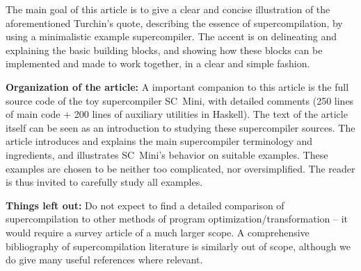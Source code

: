 The main goal of this article is to give a clear and concise illustration of the
aforementioned Turchin's quote, describing the essence of supercompilation,
by using a minimalistic example supercompiler.
The accent is on delineating and explaining the basic building blocks, 
and showing how these blocks can be implemented and made to work together,
in a clear and simple fashion.

\textbf{Organization of the article:}
A important companion to this article is the full source code of the toy supercompiler
SC~Mini, with detailed comments \cite{SCMiniUrl}
(250 lines of main code + 200 lines of auxiliary utilities in Haskell).
The text of the article itself can be seen as an introduction to studying
these supercompiler sources.
The article introduces and explains the main supercompiler terminology and ingredients,
and illustrates SC~Mini's behavior on suitable examples.
These examples are chosen to be neither too complicated, nor oversimplified.
The reader is thus invited to carefully study all examples.


\textbf{Things left out:} 
Do not expect to find a detailed comparison of supercompilation to other methods
of program optimization/transformation -- it would require a survey article
of a much larger scope. 
A comprehensive bibliography of supercompilation literature is similarly out of scope,
although we do give many useful references where relevant.


